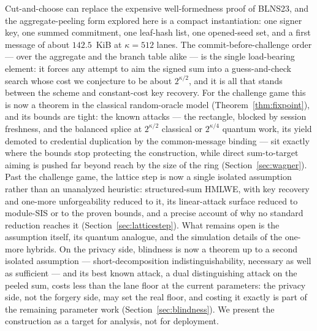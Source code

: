 \documentclass[11pt]{article}
\begin{document}
Cut-and-choose can replace the expensive well-formedness proof of BLNS23, and
the aggregate-peeling form explored here is a compact instantiation:
one signer key, one summed commitment, one leaf-hash list, one opened-seed
set, and a first message of about $142.5$~KiB at $\kappa=512$ lanes.  The
commit-before-challenge order --- over the aggregate and the branch table
alike --- is the single load-bearing
element: it forces any attempt to aim the signed sum into a guess-and-check
search whose cost we conjecture to be about $2^{\kappa/2}$, and it is all that
stands between the scheme and constant-cost key recovery.  For the challenge
game this is now a theorem in the classical random-oracle model
(Theorem~\ref{thm:fixpoint}), and its bounds are tight: the known attacks
--- the rectangle, blocked by session freshness, and the balanced splice at
$2^{\kappa/2}$ classical or $2^{\kappa/4}$ quantum work, its yield demoted to
credential duplication by the common-message binding --- sit exactly where
the bounds stop protecting the construction, while direct sum-to-target
aiming is pushed far beyond reach by the
size of the ring (Section~\ref{sec:wagner}).  Past the challenge game, the
lattice step is now a single isolated assumption rather than an unanalyzed
heuristic: structured-sum HMLWE, with key recovery and one-more
unforgeability reduced to it, its linear-attack surface reduced to module-SIS
or to the proven bounds, and a precise account of why no standard reduction
reaches it (Section~\ref{sec:latticestep}).  What remains open is the
assumption itself, its quantum analogue, and the simulation details of the
one-more hybrids.
On the privacy side, blindness is now a theorem up to a second isolated
assumption --- short-decomposition indistinguishability, necessary as well
as sufficient --- and its best known attack, a dual distinguishing attack
on the peeled sum, costs less than the lane floor at the current parameters:
the privacy side, not the forgery side, may set the real floor, and costing
it exactly is part of the remaining parameter work
(Section~\ref{sec:blindness}).
We present the construction as a target for analysis, not for deployment.
\end{document}
